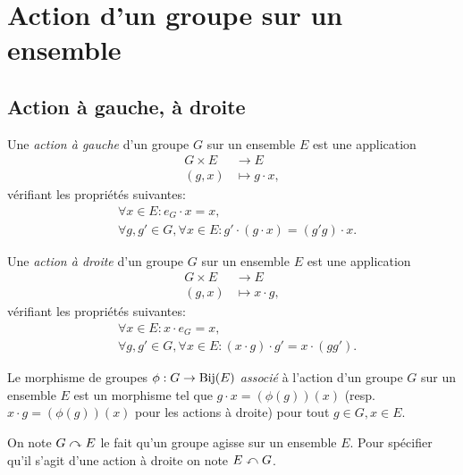 \section{Action d'un groupe sur un ensemble}
\subsection{Action à gauche, à droite}

\begin{definition}
	Une \emph{action à gauche} d'un groupe $G$ sur un ensemble $E$ est une application
	\begin{align*}
		G \times E &\to E \\
		(g, x) &\mapsto g \cdot x,
	\end{align*}
	vérifiant les propriétés suivantes:
	\begin{align*}
		& \forall x \in E: e_G \cdot x = x, \\
		& \forall g, g' \in G, \forall x \in E:
			g' \cdot (g \cdot x) = (g' g) \cdot x.
	\end{align*}
\end{definition}

\begin{definition}
	Une \emph{action à droite} d'un groupe $G$ sur un ensemble $E$ est une application
	\begin{align*}
		G \times E &\to E \\
		(g, x) &\mapsto x \cdot g,
	\end{align*}
	vérifiant les propriétés suivantes:
	\begin{align*}
		& \forall x \in E: x \cdot e_G = x, \\
		& \forall g, g' \in G, \forall x \in E:
			(x \cdot g) \cdot g' = x \cdot (g g').
	\end{align*}
\end{definition}

\begin{definition}
	Le morphisme de groupes $\phi : G \to \operatorname{Bij}(E)$ \emph{associé} à l'action d'un
	groupe $G$ sur un ensemble $E$ est un morphisme tel que $g \cdot x = (\phi(g))(x)$
	(resp. $x \cdot g = (\phi(g))(x)$ pour les actions à droite)
	pour tout $g \in G, x \in E$.
\end{definition}

\begin{notation}
	On note $G \curvearrowright E$ le fait qu'un groupe agisse sur un ensemble $E$.
	Pour spécifier qu'il s'agit d'une action à droite on note $E \curvearrowleft G$.
\end{notation}


